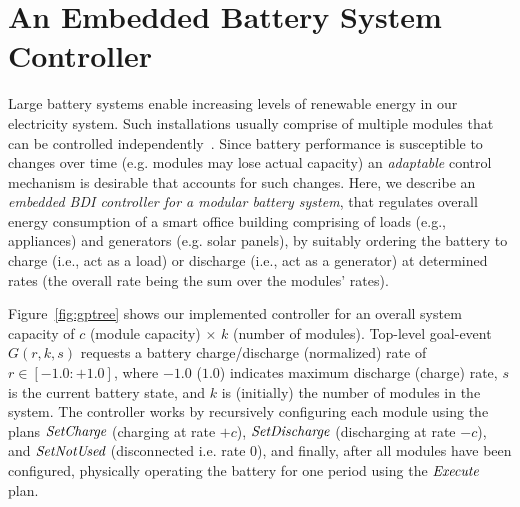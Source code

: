 \section{An Embedded Battery System Controller}\label{sec:application}

\newcommand{\aSet}{\mathname{set}}
\newcommand{\aOperate}{\mathname{operate}}
\newcommand{\aEvaluate}{\mathname{evaluate}}

\newcommand{\pSet}{\mathname{Set*}}
\newcommand{\pSetCharge}{\mathname{SetCharge}}
\newcommand{\pSetDischarge}{\mathname{SetDischarge}}
\newcommand{\pSetNotUsed}{\mathname{SetNotUsed}}
\newcommand{\pExecute}{\mathname{Execute}}

\newcommand{\cSatisfies}{\psi}



Large battery systems enable increasing levels of renewable energy in our electricity system. 
%
Such installations usually comprise of multiple modules that can be controlled independently~\cite{norris02:grid}. 
Since battery performance is susceptible to changes over time (e.g. modules may lose actual capacity) an \emph{adaptable} control mechanism is desirable that accounts for such changes.
%
Here, we describe an {\em embedded BDI controller for a modular battery system}, that regulates overall energy consumption of a smart office building comprising of loads (e.g., appliances) and generators (e.g. solar panels), by suitably ordering the battery to charge (i.e., act as a load) or discharge (i.e., act as a generator) at determined rates (the overall rate being the sum over the modules' rates).

Figure~\ref{fig:gptree} shows our implemented controller for an overall system capacity of $c$ (module capacity) $\times$ $k$ (number of modules). Top-level goal-event $G(r,k,s)$ requests a battery charge/discharge (normalized) rate of $r \in [-1.0:+1.0]$, where $-1.0$ ($1.0$) indicates maximum discharge (charge) rate, $s$ is the current battery state, and $k$ is (initially) the number of modules in the system. 
The controller works by recursively configuring each module using the plans $\pSetCharge$ (charging at rate $+c$), $\pSetDischarge$ (discharging at rate $-c$), and $\pSetNotUsed$ (disconnected i.e. rate $0$), and finally, after all modules have been configured, physically operating the battery for one period using the $\pExecute$ plan. 

